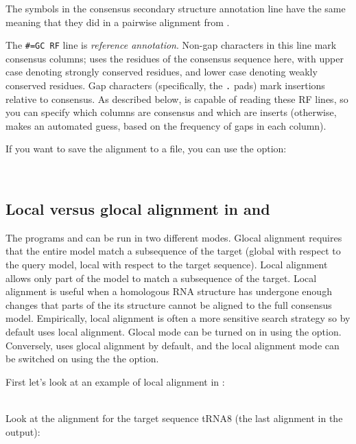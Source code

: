 The symbols in the consensus secondary structure annotation line have
the same meaning that they did in a pairwise alignment from
.

The {\small\verb+#=GC RF+} line is \emph{reference
annotation}. Non-gap characters in this line mark consensus columns;
 uses the residues of the consensus sequence here, with
upper case denoting strongly conserved residues, and lower case
denoting weakly conserved residues. Gap characters (specifically, the
\verb+.+ pads) mark insertions relative to consensus. As described
below,  is capable of reading these RF lines, so you can
specify which columns are consensus and which are inserts (otherwise,
 makes an automated guess, based on the frequency of
gaps in each column).

If you want to save the alignment to a file, you can use the 
option:

\\

\subsection{Local versus glocal alignment in  and }

The programs  and  can be run in two
different modes. Glocal alignment requires that the entire model match
a subsequence of the target (global with respect to the query model,
local with respect to the target sequence). Local alignment allows
only part of the model to match a subsequence of the target. Local
alignment is useful when a homologous RNA structure has undergone
enough changes that parts of the its structure cannot be aligned to
the full consensus model. Empirically, local alignment is often a more
sensitive search strategy so by default  uses local
alignment. Glocal mode can be turned on in  using the
 option. Conversely,  uses glocal alignment by
default, and the local alignment mode can be switched on using the the
 option.

First let's look at an example of local alignment in :

\\

Look at the alignment for the target sequence tRNA8 (the last alignment in the output): 

